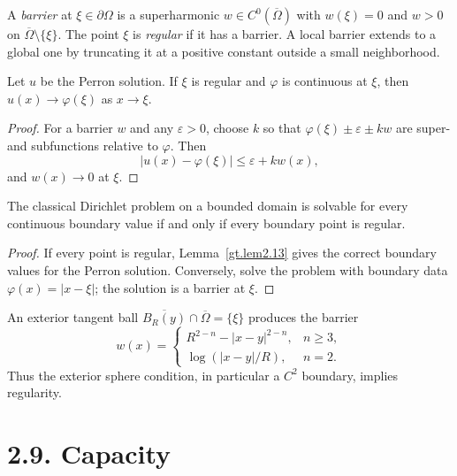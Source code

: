 A \emph{barrier} at $\xi\in\partial\Omega$ is a superharmonic
$w\in C^0(\overline\Omega)$ with $w(\xi)=0$ and
$w>0$ on $\overline\Omega\setminus\{\xi\}$. The point $\xi$ is
\emph{regular} if it has a barrier. A local barrier extends to a global one
by truncating it at a positive constant outside a small neighborhood.

\begin{lemma}\label{gt.lem2.13}
Let $u$ be the Perron solution. If $\xi$ is regular and $\varphi$ is
continuous at $\xi$, then $u(x)\to\varphi(\xi)$ as $x\to\xi$.
\end{lemma}
\begin{proof}
\sketch For a barrier $w$ and any $\varepsilon>0$, choose $k$ so that
$\varphi(\xi)\pm\varepsilon\pm kw$ are super- and subfunctions relative to
$\varphi$. Then
\[
|u(x)-\varphi(\xi)|\leq\varepsilon+kw(x),
\]
and $w(x)\to0$ at $\xi$.
\end{proof}

\begin{theorem}\label{gt.thm2.14}
The classical Dirichlet problem on a bounded domain is solvable for every
continuous boundary value if and only if every boundary point is regular.
\end{theorem}
\begin{proof}
\sketch If every point is regular, Lemma~\ref{gt.lem2.13} gives the correct
boundary values for the Perron solution. Conversely, solve the problem with
boundary data $\varphi(x)=|x-\xi|$; the solution is a barrier at $\xi$.
\end{proof}

An exterior tangent ball $\overline{B_R(y)}\cap\overline\Omega=\{\xi\}$
produces the barrier
\begin{equation}
\tag{2.34}
w(x)=\begin{cases}
R^{2-n}-|x-y|^{2-n},&n\geq3,\\
\log(|x-y|/R),&n=2.
\end{cases}
\end{equation}
Thus the exterior sphere condition, in particular a $C^2$ boundary, implies
regularity.

\section*{2.9. Capacity}

